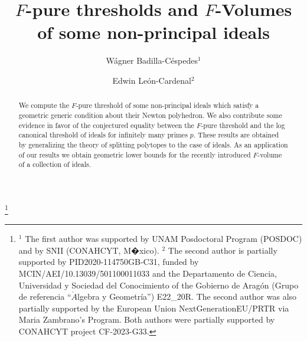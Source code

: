 \documentclass[12pt]{amsart}
\theoremstyle{definition}
\numberwithin{equation}{subsection}
\renewcommand{\!}[1]{{\color{red}\text{\Huge$\star$ }#1}}
\begin{document}
	
\title{$F$-pure thresholds and $F$-Volumes of some non-principal ideals}
	
\author[W. Badilla-C\'espedes]{W\'agner Badilla-C\'espedes$^{1}$}
\address{Centro de Ciencias Matem�ticas, UNAM, Campus Morelia, Morelia, Michoac�n, M�xico.}

	
\author[E. Le\'on-Cardenal]{Edwin Le\'on-Cardenal$^{2}$}
\address{Departamento de Matem�ticas y Computaci�n, Universidad de La Rioja\\
	C. Madre de Dios, 53, 26006, Logro\~no, Spain.}
\thanks{$^{1}$ The first author was supported by UNAM Posdoctoral Program (POSDOC) and by SNII (CONAHCYT, M�xico). $^{2}$ The second author is partially supported by PID2020-114750GB-C31, funded by MCIN/AEI/10.13039/501100011033 and the Departamento de Ciencia, Universidad y Sociedad del Conocimiento of the	Gobierno de Arag\'on (Grupo de referencia ``$\acute{A}$lgebra y Geometr\'ia'') E22\_20R. The second author was also partially supported by the European Union NextGenerationEU/PRTR via Maria Zambrano's Program. Both authors were partially supported by CONAHCYT project CF-2023-G33.}


\begin{abstract}
	We compute the $F$-pure threshold of some non-principal ideals which satisfy a geometric generic condition about their Newton polyhedron. We also contribute some evidence in favor of the conjectured equality between the $F$-pure threshold and the log canonical threshold of ideals for infinitely many primes $p$. These results are obtained by generalizing the theory of splitting polytopes to the case of ideals. As an application of our results we obtain geometric lower bounds for the recently introduced $F$-volume of a collection of ideals.
\end{abstract}
	
\maketitle
	
\end{document}
